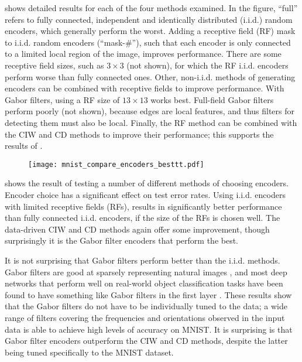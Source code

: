  shows detailed results
for each of the four methods examined.
In the figure, ``full'' refers to fully connected,
independent and identically distributed (i.i.d.) random encoders,
which generally perform the worst.
Adding a receptive field (RF) mask to i.i.d. random encoders (``mask-\#''),
such that each encoder is only connected to a limited local region of the image,
improves performance.
There are some receptive field sizes, such as $3 \times 3$ (not shown),
for which the RF i.i.d. encoders perform worse than fully connected ones.
Other, non-i.i.d. methods of generating encoders can be combined
with receptive fields to improve performance.
With Gabor filters, using a RF size of $13 \times 13$ works best.
Full-field Gabor filters perform poorly (not shown),
because edges are local features,
and thus filters for detecting them must also be local.
Finally, the RF method can be combined with the CIW and CD methods
to improve their performance;
this supports the results of \textcite{McDonnell2015}.


\begin{figure}
  \centering
  \texttt{[image: mnist\_compare\_encoders\_besttt.pdf]}
\end{figure}

 shows the result of testing a number of different methods
of choosing encoders.
Encoder choice has a significant effect on test error rates.
Using i.i.d. encoders with limited receptive fields (RFs),
results in significantly better performance than fully connected i.i.d. encoders,
if the size of the RFs is chosen well.
The data-driven CIW and CD methods again offer some improvement,
though surprisingly it is the Gabor filter encoders that perform the best.

It is not surprising that Gabor filters perform better
than the i.i.d. methods.
Gabor filters are good at sparsely representing natural images \parencite{Olshausen1996},
and most deep networks that perform well on real-world object classification tasks
have been found to have something like Gabor filters in the first layer \parencite[\eg/][]{Krizhevsky2012}.
These results show that the Gabor filters do not have to be
individually tuned to the data;
a wide range of filters covering the frequencies and orientations
observed in the input data
is able to achieve high levels of accuracy on MNIST.
It is surprising is that Gabor filter encoders
outperform the CIW and CD methods,
despite the latter being tuned specifically to the MNIST dataset.

